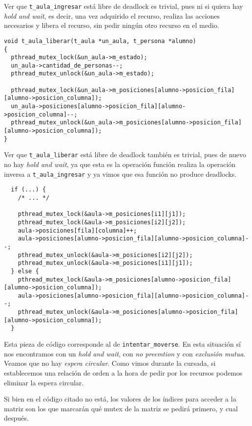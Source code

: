 \documentclass[a4paper]{article}
\begin{document}
Ver que \verb|t_aula_ingresar| está libre de deadlock es trivial, pues ni si quiera
hay \textit{hold and wait}, es decir, una vez adquirido el recurso, realiza las
acciones necesarios y libera el recurso, sin pedir ningún otro recurso en el medio.

\begin{verbatim}
void t_aula_liberar(t_aula *un_aula, t_persona *alumno)
{
  pthread_mutex_lock(&un_aula->m_estado);
  un_aula->cantidad_de_personas--;
  pthread_mutex_unlock(&un_aula->m_estado);

  pthread_mutex_lock(&un_aula->m_posiciones[alumno->posicion_fila][alumno->posicion_columna]);
  un_aula->posiciones[alumno->posicion_fila][alumno->posicion_columna]--;
  pthread_mutex_unlock(&un_aula->m_posiciones[alumno->posicion_fila][alumno->posicion_columna]);
}
\end{verbatim}

Ver que \verb|t_aula_liberar| está libre de deadlock también es trivial, pues de nuevo
no hay \textit{hold and wait}, ya que esta es la operación función realiza la operación
inversa a \verb|t_aula_ingresar| y ya vimos que esa función no produce deadlocks.

\begin{verbatim}
  if (...) {
    /* ... */
    
    pthread_mutex_lock(&aula->m_posiciones[i1][j1]);
    pthread_mutex_lock(&aula->m_posiciones[i2][j2]);
    aula->posiciones[fila][columna]++;
    aula->posiciones[alumno->posicion_fila][alumno->posicion_columna]--;
    pthread_mutex_unlock(&aula->m_posiciones[i2][j2]);
    pthread_mutex_unlock(&aula->m_posiciones[i1][j1]);
  } else {
    pthread_mutex_lock(&aula->m_posiciones[alumno->posicion_fila][alumno->posicion_columna]);
    aula->posiciones[alumno->posicion_fila][alumno->posicion_columna]--;
    pthread_mutex_unlock(&aula->m_posiciones[alumno->posicion_fila][alumno->posicion_columna]);
  }
\end{verbatim}

Esta pieza de código corresponde al de \verb|intentar_moverse|. En esta situación sí nos encontramos con un \textit{hold and wait}, con  \textit{no preemtion} y con \textit{exclusión mutua}. Veamos que no hay \textit{espera circular}. Como vimos durante la cursada, si establecemos una relación de orden a la hora de pedir por los recursos podemos eliminar la espera circular.

Si bien en el código citado no está, los valores de los índices para acceder a la matriz son los que marcarán qué mutex de la matriz se pedirá primero, y cual después.
\end{document}
